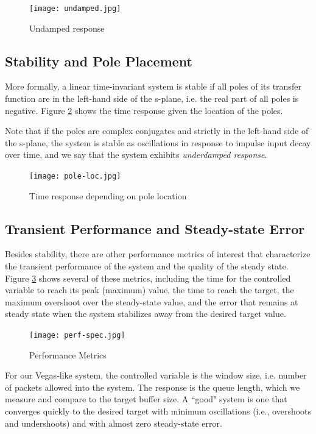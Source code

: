 \documentclass{article}
\begin{document}
\begin{figure}[htbp] %
   \centering
   \texttt{[image: undamped.jpg]} 
   \caption{Undamped response}
   \label{fig:undamped}
\end{figure}

\subsection{Stability and Pole Placement}

More formally, a linear time-invariant system is stable if
all poles of its transfer function are in the left-hand side of the s-plane,
i.e. the real part of all poles is negative.
Figure \ref{fig:pole-loc} shows the time response given the location 
of the poles. 

Note that if the poles are complex conjugates and strictly in the left-hand side 
of the s-plane, the system is stable as oscillations in response to impulse input decay over time,
and we say that the system exhibits {\em underdamped response}.
\begin{figure}[htbp]
   \centering
   \texttt{[image: pole-loc.jpg]} %
   \caption{Time response depending on pole location}
   \label{fig:pole-loc}
\end{figure}

\subsection{Transient Performance and Steady-state Error}
\label{sec:transient}

Besides stability, there are other performance metrics of interest that
characterize the transient performance of the system and the quality 
of the steady state.
Figure \ref{fig:transient} shows several of these metrics,
including the time for the controlled variable to reach its peak (maximum) value,
the time to reach the target, 
the maximum overshoot over the steady-state value,
and the error that remains at steady state
when the system stabilizes away from the desired target value.

\begin{figure}[htbp]
   \centering
   \texttt{[image: perf-spec.jpg]} %
   \caption{Performance Metrics}
   \label{fig:transient}
\end{figure}

For our Vegas-like system,
the controlled variable is the window size, i.e. number of packets
allowed into the system. The response is the queue length, which
we measure and compare to the target  buffer size.
A ``good" system is one that converges quickly to the desired target
with minimum oscillations (i.e., overshoots and undershoots) and
with almost zero steady-state error.
\end{document}
